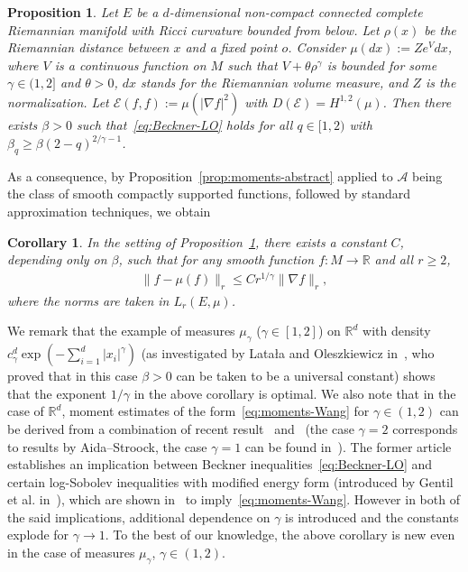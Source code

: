 \documentclass[a4paper]{amsart}
\newtheorem{corollary}[theorem]{Corollary} %
\newtheorem{proposition}[theorem]{Proposition} %
\theoremstyle{definition}
\theoremstyle{remark}
\numberwithin{equation}{section}
\newcommand*{\RR}{\mathbb{R}}
\newcommand*{\calA}{\mathcal{A}}
\begin{document}
\begin{proposition}
\label{prop:Wang}
Let $E$ be a $d$-dimensional non-compact connected complete
Riemannian manifold with Ricci curvature bounded from below. Let $\rho(x)$ be the Riemannian distance between $x$ and a fixed point $o$. Consider $\mu(dx) := Ze^{V} dx$,
where $V$ is a continuous function on  $M$ such that $V + \theta \rho^\gamma$
is bounded for some $\gamma \in (1, 2]$ and $\theta >0$, $dx$ stands for the Riemannian volume measure, and $Z$ is the normalization. Let
$\mathcal{E}(f,f) := \mu(|\nabla f|^2)$ with $D(\mathcal{E}) = H^{1,2}(\mu)$. Then there exists $\beta > 0$ such that~\eqref{eq:Beckner-LO} holds for all $q \in [1,2)$ with
$\beta_q \ge \beta(2-q)^{2/\gamma - 1}$.
\end{proposition}

As a consequence, by Proposition~\ref{prop:moments-abstract} applied to $\calA$ being the class of  smooth compactly supported functions, followed by standard approximation techniques, we obtain

\begin{corollary}
\label{cor:moments-Wang}
In the setting of Proposition~\ref{prop:Wang}, there exists a constant $C$, depending only on $\beta$, such that for any smooth function $f\colon M\to \RR$ and all $r \ge 2$,
\begin{align}\label{eq:moments-Wang}
  \|f - \mu (f)\|_r \le Cr^{1/\gamma}\|\nabla f\|_r,
\end{align}
where the norms are taken in $L_r(E,\mu)$.
\end{corollary}

We remark that the example of measures $\mu_\gamma$ ($\gamma\in [1,2]$) on $\RR^d$ with density $c_\gamma^d\exp(-\sum_{i=1}^d |x_i|^\gamma)$ (as investigated by Lata{\l}a and Oleszkiewicz in~\cite{MR1796718}, who proved that in this case $\beta>0 $ can be taken to be a universal constant) shows that the exponent $1/\gamma$ in the above corollary is optimal. We also note that in the case of $\RR^d$, moment estimates of the form~\eqref{eq:moments-Wang} for $\gamma \in (1,2)$ can be derived from a combination of recent result~\cite{barthe2019functional} and~\cite{MR3383337} (the case $\gamma=2$ corresponds to results by Aida--Stroock, the case $\gamma=1$ can be found in~\cite{MR2507637}). 
The former article establishes an implication between Beckner inequalities~\eqref{eq:Beckner-LO} and certain log-Sobolev inequalities with modified energy form (introduced by Gentil et al. in~\cite{MR2198019}), which are shown in~\cite{MR3383337} to imply~\eqref{eq:moments-Wang}. 
However in both of the said implications, additional dependence on $\gamma$ is introduced and the constants explode for $\gamma\to 1$. 
To the best of our knowledge, the above corollary is new even in the case of measures $\mu_\gamma$, $\gamma\in (1,2)$.
\end{document}
